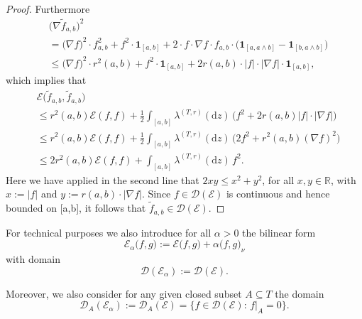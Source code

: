 \documentclass[11pt]{amsart}
\numberwithin{equation}{section}
\begin{document}
{{\begin{proof}
Furthermore
\begin{equation}\label{e:calcc2}
\begin{aligned}
   &\big(\nabla\tilde{f}_{a,b}\big)^2
  \\
 &=
   \big(\nabla f\big)^2\cdot f^2_{a,b}+f^2\cdot\mathbf{1}_{[a,b]}+2\cdot f\cdot\nabla f\cdot f_{a,b}
   \cdot\big(\mathbf{1}_{[a,a\wedge b]}-\mathbf{1}_{[b,a \wedge b]}\big)
  \\
 &\le
   \big(\nabla f\big)^2\cdot r^2(a,b)+f^2\cdot\mathbf{1}_{[a,b]}+2r(a,b)\cdot {|f|}\cdot\big|\nabla f\big|
   \cdot\mathbf{1}_{[a,b]},
\end{aligned}
\end{equation}
which implies that\label{Exp:05}
\begin{equation}\label{dirform}
\begin{aligned}
   &{\mathcal E}\big(\tilde{f}_{a,b},\tilde{f}_{a,b}\big)
   \\
 &\le
   r^2(a,b){\mathcal E}(f,f)+\frac{1}{2}\int_{[a,b]}\lambda^{(T,r)}(\mathrm{d}z)\,\big(f^2+2r(a,b)|f|\cdot|\nabla f|\big)
  \\
 &\le
   r^2(a,b){\mathcal E}(f,f)+\frac{1}{2}\int_{[a,b]}\lambda^{(T,r)}(\mathrm{d}z)\,\big(2f^2+r^{2}(a,b)(\nabla f)^{2}\big)
  \\
 &\le
   2r^2(a,b){\mathcal E}(f,f)+ \int_{[a,b]}\lambda^{(T,r)}(\mathrm{d}z)\,f^2.
\end{aligned}
\end{equation}
Here we have applied in the second line that $2xy\le x^2+y^2$, for all $x,y\in{{\mathbb R}}$, with $x:=|f|$ and $y:=r(a,b)\cdot|\nabla f|$.
Since $f\in{\mathcal D}({\mathcal E})$ is continuous and hence bounded on [a,b],
it follows that $\tilde{f}_{a,b}\in{\mathcal D}({\mathcal E})$.
\end{proof}{\smallskip}}

For technical purposes we also introduce for all $\alpha> 0$
the bilinear form
\begin{equation}\label{con.2b}
   \mathcal E_{\alpha}\big(f,g\big)
 :=
   \mathcal E\big(f,g\big)+\alpha\big(f,g\big)_{\nu}
\end{equation}
with domain
\begin{equation}\label{domainalp}
   {\mathcal D}({\mathcal E}_{\alpha})
 :=
   {\mathcal D}(\mathcal E).
\end{equation}

Moreover, we also consider for any given closed subset $A\subseteq T$ the domain
\begin{equation}\label{con.2a}
    \mathcal D_A(\mathcal E_{\alpha})
 :=
    \mathcal D_A(\mathcal E)
 =
    \big\{f\in\mathcal D(\mathcal E):\,f|_A=0\big\}.
\end{equation}
{\smallskip}

}
\end{document}
